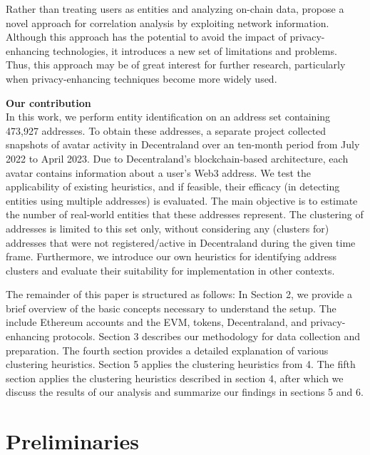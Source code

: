 \documentclass[12pt,a4paper,titlepage,oneside,english]{article}
\begin{document}
Rather than treating users as entities and analyzing on-chain data, \cite{yu2023} propose a novel approach for correlation analysis by exploiting network information. Although this approach has the potential to avoid the impact of privacy-enhancing technologies, it introduces a new set of limitations and problems. Thus, this approach may be of great interest for further research, particularly when privacy-enhancing techniques become more widely used.


\textbf{Our contribution}\\
In this work, we perform entity identification on an address set containing 473,927 addresses. To obtain these addresses, a separate project collected snapshots of avatar activity in Decentraland over an ten-month period from July 2022 to April 2023. Due to Decentraland's blockchain-based architecture, each avatar contains information about a user's Web3 address. 
We test the applicability of existing heuristics, and if feasible, their efficacy (in detecting entities using multiple addresses) is evaluated.
The main objective is to estimate the number of real-world entities that these addresses represent. The clustering of addresses is limited to this set only, without considering any (clusters for) addresses that were not registered/active in Decentraland during the given time frame.
Furthermore, we introduce our own heuristics for identifying address clusters and evaluate their suitability for implementation in other contexts.

The remainder of this paper is structured as follows: In Section 2, we provide a brief overview of the basic concepts necessary to understand the setup. The include Ethereum accounts and the EVM, tokens, Decentraland, and privacy-enhancing protocols. Section 3 describes our methodology for data collection and preparation. The fourth section provides a detailed explanation of various clustering heuristics. Section 5 applies the clustering heuristics from 4. The fifth section applies the clustering heuristics described in section 4, after which we discuss the results of our analysis and summarize our findings in sections 5 and 6.


\section{Preliminaries}
\end{document}
